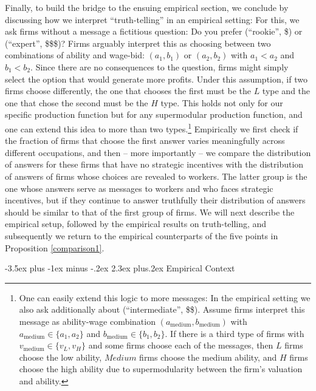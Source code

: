 \documentclass[12pt]{article}
\makeatletter
\renewcommand{\section}{%
  \@startsection{section}{1}{\z@}%
  {-3.5ex plus -1ex minus -.2ex}%
  {2.3ex plus.2ex}%
  {\normalfont\Large\bfseries}%
}
\makeatother
\begin{document}
Finally, to build the bridge to the ensuing empirical section, we conclude by discussing how we interpret ``truth-telling'' in an empirical setting: For this, we ask firms without a message a fictitious question: Do you prefer (``rookie'', \$) or (``expert'', \$\$\$)? Firms arguably interpret this as choosing between two combinations of ability and wage-bid: $(a_{1},b_{1})$ or $(a_{2},b_{2})$ with $a_{1}<a_{2}$ and $b_{1}<b_{2}.$ Since there are no consequences to the question, firms might simply select the option that would generate more profits. Under this assumption, if two firms choose differently, the one that chooses the first must be the $L$ type and the one that chose the second must be the $H$ type. This holds not only for our specific production function but for any supermodular production function, and one can extend this idea to more than two types.\footnote{One can easily extend this logic to more messages: In the empirical setting we also ask additionally about (``intermediate'', \$\$). Assume firms interpret this message as ability-wage combination $(a_{\text{medium}},b_{\text{medium}})$ with $a_{\text{medium}} \in \{a_1,a_2 \}$ and $b_{\text{medium}} \in \{b_1,b_2 \}$. If there is a third type of firms with $v_{\text{medium}} \in \{v_L,v_H\}$ and some firms choose each of the messages, then $L$ firms choose the low ability, $Medium$ firms choose the medium ability, and $H$ firms choose the high ability due to supermodularity between the firm's valuation and ability.} Empirically we first check if the fraction of firms that choose the first answer varies meaningfully across different occupations, and then -- more importantly -- we compare the distribution of answers for these firms that have no strategic incentives with the distribution of answers of firms whose choices are revealed to workers. The latter group is the one whose answers serve as messages to workers and who faces strategic incentives, but if they continue to answer truthfully their distribution of answers should be similar to that of the first group of firms. We will next describe the empirical setup, followed by the empirical results on truth-telling, and subsequently we return to the empirical counterparts of the five points in Proposition \ref{comparison1}.



\section{Empirical Context} \label{sec:empirical_context}
\end{document}
